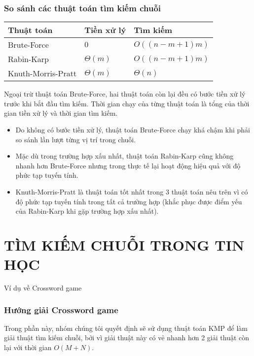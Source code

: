 \documentclass[a4paper,11pt]{article}
\begin{document}
	\section{So sánh các thuật toán tìm kiếm chuỗi}
\begin{center}
 \begin{tabular}{||m{4cm} | m{4cm} m{4cm}||} 
 \hline
 Thuật toán & Tiền xử lý & Tìm kiếm \\ [1ex] 
 \hline\hline
 Brute-Force & $0$ & $O((n-m+1)m)$ \\ [1ex] 
 \hline
 Rabin-Karp & $\Theta(m)$ & $O((n-m+1)m)$ \\ [1ex] 
 \hline
 Knuth-Morris-Pratt & $\Theta(m)$ & $\Theta(n)$ \\ [1ex] 
 \hline
\end{tabular}
\end{center}

Ngoại trừ thuật toán Brute-Force, hai thuật toán còn lại đều có bước tiền xử lý trước khi bắt đầu tìm kiếm. Thời gian chạy của từng thuật toán là tổng của thời gian tiền xử lý và thời gian tìm kiếm.

			\begin{itemize}
				\item Do không có bước tiền xử lý, thuật toán Brute-Force chạy khá chậm khi phải so sánh lần lượt từng vị trí trong chuỗi.
				\item Mặc dù trong trường hợp xấu nhất, thuật toán Rabin-Karp cũng không nhanh hơn Brute-Force nhưng trong thực tế lại hoạt động hiệu quả với độ phức tạp tuyến tính.
				\item Knuth-Morris-Pratt là thuật toán tốt nhất trong 3 thuật toán nêu trên vì có độ phức tạp tuyến tính trong tất cả trường hợp (khắc phục được điểm yếu của Rabin-Karp khi gặp trường hợp xấu nhất).
			\end{itemize}
	
	\part{TÌM KIẾM CHUỖI TRONG TIN HỌC}
	\Large {Ví dụ về Crossword game}
	\setcounter{section}{0}
	\section{Hướng giải Crossword game}

	Trong phần này, nhóm chúng tôi quyết định sẽ sử dụng thuật toán KMP để làm giải thuật tìm kiếm chuỗi, bởi vì giải thuật này có vẻ nhanh hơn 2 giải thuật còn lại với thời gian $O(M + N)$.
\end{document}
